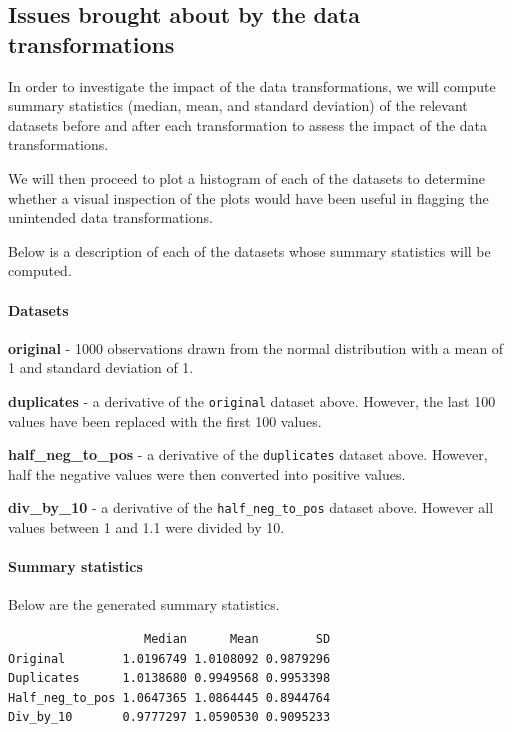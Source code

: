 \documentclass[
  letterpaper,
  DIV=11,
  numbers=noendperiod]{scrartcl}
\let\oldparagraph\paragraph
\renewcommand{\paragraph}[1]{\oldparagraph{#1}\mbox{}}
\begin{document}
\hypertarget{issues-brought-about-by-the-data-transformations}{%
\subsection{Issues brought about by the data
transformations}\label{issues-brought-about-by-the-data-transformations}}

In order to investigate the impact of the data transformations, we will
compute summary statistics (median, mean, and standard deviation) of the
relevant datasets before and after each transformation to assess the
impact of the data transformations.

We will then proceed to plot a histogram of each of the datasets to
determine whether a visual inspection of the plots would have been
useful in flagging the unintended data transformations.

Below is a description of each of the datasets whose summary statistics
will be computed.

\hypertarget{datasets}{%
\paragraph{Datasets}\label{datasets}}

\textbf{original} - 1000 observations drawn from the normal distribution
with a mean of 1 and standard deviation of 1.

\textbf{duplicates} - a derivative of the \texttt{original} dataset
above. However, the last 100 values have been replaced with the first
100 values.

\textbf{half\_neg\_to\_pos} - a derivative of the \texttt{duplicates}
dataset above. However, half the negative values were then converted
into positive values.

\textbf{div\_by\_10} - a derivative of the \texttt{half\_neg\_to\_pos}
dataset above. However all values between 1 and 1.1 were divided by 10.

\hypertarget{summary-statistics}{%
\paragraph{Summary statistics}\label{summary-statistics}}

Below are the generated summary statistics.

\begin{verbatim}
                   Median      Mean        SD
Original        1.0196749 1.0108092 0.9879296
Duplicates      1.0138680 0.9949568 0.9953398
Half_neg_to_pos 1.0647365 1.0864445 0.8944764
Div_by_10       0.9777297 1.0590530 0.9095233
\end{verbatim}
\end{document}
